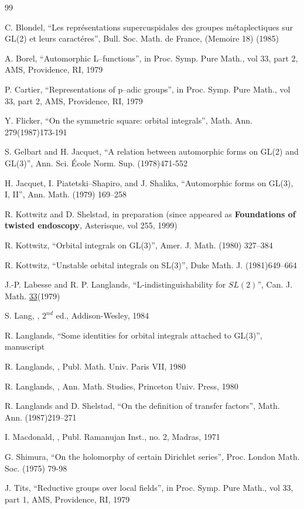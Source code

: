 \documentclass[12pt,letterpaper]{article}
\begin{document}
\begin{thebibliography}{99}


C. Blondel, ``Les repr\'esentations supercuspidales des groupes 
m\'etaplectiques sur GL(2) et leurs caract\'eres'', Bull. Soc. Math. de 
France, (Memoire 18) (1985)

A. Borel, ``Automorphic L--functions'', in Proc. Symp. Pure
Math., vol 33, part 2, AMS, Providence, RI, 1979

 P. Cartier, ``Representations of p--adic groups'', in Proc. 
Symp. Pure Math., vol 33, part 2, AMS, Providence, RI, 1979

 Y. Flicker, ``On the symmetric square: orbital integrals'',
Math. Ann. 279(1987)173-191

S. Gelbart and H. Jacquet, ``A relation between automorphic forms
on GL(2) and GL(3)'', Ann. Sci. \'Ecole Norm. Sup. 
(1978)471-552

 H. Jacquet, I. Piatetski--Shapiro, and J. Shalika,
``Automorphic forms on GL(3), I, II'', Ann. Math.  
(1979) 169--258

 R. Kottwitz and D. Shelstad, in preparation
(since appeared as {\bf Foundations of twisted endoscopy}, 
Asterisque, vol 255, 1999)

 R. Kottwitz, ``Orbital integrals on GL(3)'', Amer. J. Math.
 (1980) 327--384

 R. Kottwitz, ``Unstable orbital integrals on SL(3)'', 
Duke Math. J. (1981)649--664

 J.-P. Labesse and R. P. Langlands,
``L-indistinguishability for
$SL(2)$'', Can. J. Math. \underline{33}(1979)

 S. Lang, , $2^{nd}$ ed., Addison-Wesley,
1984

 R. Langlands, ``Some identities for orbital integrals 
attached to GL(3)'', manuscript

 R. Langlands, , Publ. Math. Univ. Paris VII, 1980 

 R. Langlands, , 
Ann. Math. Studies, Princeton Univ. Press, 1980 

 R. Langlands and D. Shelstad, ``On the definition of transfer 
factors'', Math. Ann. (1987)219--271

 I. Macdonald, , Publ. Ramanujan Inst., no. 2, Madras, 1971

 G. Shimura, ``On the holomorphy of certain Dirichlet series'',
Proc. London Math. Soc.  (1975) 79-98

 J. Tits, ``Reductive groups over local fields'', in Proc. 
Symp. Pure Math., vol 33, part 1, AMS, Providence, RI, 1979




\end{thebibliography}
\end{document}

